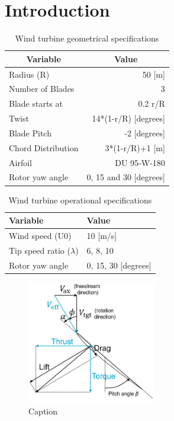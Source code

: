 \chapter{Introduction} \label{ch:Introduction}

\begin{longtable}{|l|r|}
\caption{Wind turbine geometrical specifications}
\label{tab:turbinegeometry}\\
\hline
\multicolumn{1}{|c|}{\textbf{Variable}} & \multicolumn{1}{c|}{\textbf{Value}} \\ \hline
\endhead
%
Radius (R)                              & 50 {[}m{]}                          \\ \hline
Number of Blades                        & 3                                   \\ \hline
Blade starts at                         & 0.2 r/R                             \\ \hline
Twist                                   & 14*(1-r/R) {[}degrees{]}            \\ \hline
Blade Pitch                             & -2 {[}degrees{]}                    \\ \hline
Chord Distribution                      & 3*(1-r/R)+1 {[}m{]}                 \\ \hline
Airfoil                                 & DU 95-W-180                         \\ \hline
Rotor yaw angle                         & 0, 15 and 30 {[}degrees{]}          \\ \hline
\end{longtable}

\begin{longtable}{|l|l|}
\caption{Wind turbine operational specifications}
\label{tab:operspecs}\\
\hline
\textbf{Variable}        & \textbf{Value}          \\ \hline
\endhead
%
Wind speed (U0)          & 10 {[}m/s{]}            \\ \hline
Tip speed ratio ($\lambda$) & 6, 8, 10                \\ \hline
Rotor yaw angle          & 0, 15, 30 {[}degrees{]} \\ \hline
\end{longtable}

\begin{figure}
    \centering
    \includegraphics[width=0.5\textwidth]{Figures/velocitydiagram.jpg}
    \caption{Caption}
    \label{fig:enter-label}
\end{figure}